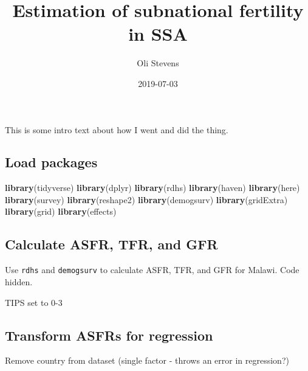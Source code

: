 \documentclass[]{article}
\title{Estimation of subnational fertility in SSA}
\author{Oli Stevens}
\date{2019-07-03}
\newenvironment{Shaded}{\begin{snugshade}}{\end{snugshade}}
\newcommand{\KeywordTok}[1]{\textcolor[rgb]{0.13,0.29,0.53}{\textbf{#1}}}
\newcommand{\DataTypeTok}[1]{\textcolor[rgb]{0.13,0.29,0.53}{#1}}
\newcommand{\StringTok}[1]{\textcolor[rgb]{0.31,0.60,0.02}{#1}}
\newcommand{\OtherTok}[1]{\textcolor[rgb]{0.56,0.35,0.01}{#1}}
\newcommand{\OperatorTok}[1]{\textcolor[rgb]{0.81,0.36,0.00}{\textbf{#1}}}
\newcommand{\NormalTok}[1]{#1}
\begin{document}
\maketitle

This is some intro text about how I went and did the thing.

\subsection{Load packages}\label{load-packages}

\begin{Shaded}
\begin{Highlighting}[]
\KeywordTok{library}\NormalTok{(tidyverse)}
\KeywordTok{library}\NormalTok{(dplyr)}
\KeywordTok{library}\NormalTok{(rdhs)}
\KeywordTok{library}\NormalTok{(haven)}
\KeywordTok{library}\NormalTok{(here)}
\KeywordTok{library}\NormalTok{(survey)}
\KeywordTok{library}\NormalTok{(reshape2)}
\KeywordTok{library}\NormalTok{(demogsurv)}
\KeywordTok{library}\NormalTok{(gridExtra)}
\KeywordTok{library}\NormalTok{(grid)}
\KeywordTok{library}\NormalTok{(effects)}
\end{Highlighting}
\end{Shaded}

\subsection{Calculate ASFR, TFR, and
GFR}\label{calculate-asfr-tfr-and-gfr}

Use \texttt{rdhs} and \texttt{demogsurv} to calculate ASFR, TFR, and GFR
for Malawi. Code hidden.

TIPS set to 0-3

\subsection{Transform ASFRs for
regression}\label{transform-asfrs-for-regression}

Remove country from dataset (single factor - throws an error in
regression?)

\begin{Shaded}
\end{Shaded}
\end{document}
